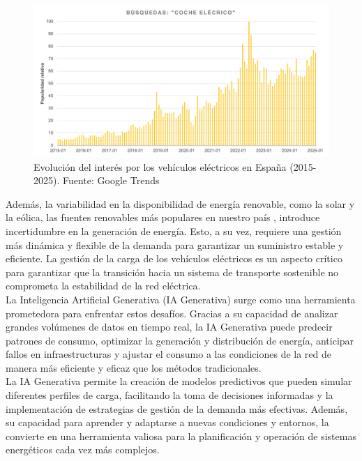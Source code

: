 \begin{figure}[ht]
    \centering
    \includegraphics[width=1\textwidth]{images/EV_search_graph.png}
    \caption{Evolución del interés por los vehículos eléctricos en España (2015-2025). 
    Fuente: Google Trends~\cite{googletrends2025}}
    \label{fig:ev_interest}
\end{figure}

Además, la variabilidad en la disponibilidad de energía renovable, como la solar y la eólica,
las fuentes renovables más populares en nuestro país%
, introduce 
incertidumbre en la generación de energía. Esto, a su vez, requiere una gestión más dinámica 
y flexible de la demanda para garantizar un suministro estable y eficiente. La gestión de la 
carga de los vehículos eléctricos es un aspecto crítico para garantizar que la transición hacia 
un sistema de transporte sostenible no comprometa la estabilidad de la red eléctrica.\\

La Inteligencia Artificial Generativa (IA Generativa) surge como una herramienta
prometedora para enfrentar estos desafíos. Gracias a su capacidad de analizar grandes
volúmenes de datos en tiempo real, la IA Generativa puede predecir patrones de consumo,
optimizar la generación y distribución de energía, anticipar fallos en infraestructuras y
ajustar el consumo a las condiciones de la red de manera más eficiente y eficaz que los métodos
tradicionales.\\

La IA Generativa permite la creación de modelos predictivos que pueden simular diferentes
perfiles de carga, facilitando la toma de decisiones informadas y la implementación de estrategias
de gestión de la demanda más efectivas. Además, su capacidad para aprender y adaptarse a nuevas 
condiciones y entornos, la convierte en una herramienta valiosa para la planificación y operación 
de sistemas energéticos cada vez más complejos.

